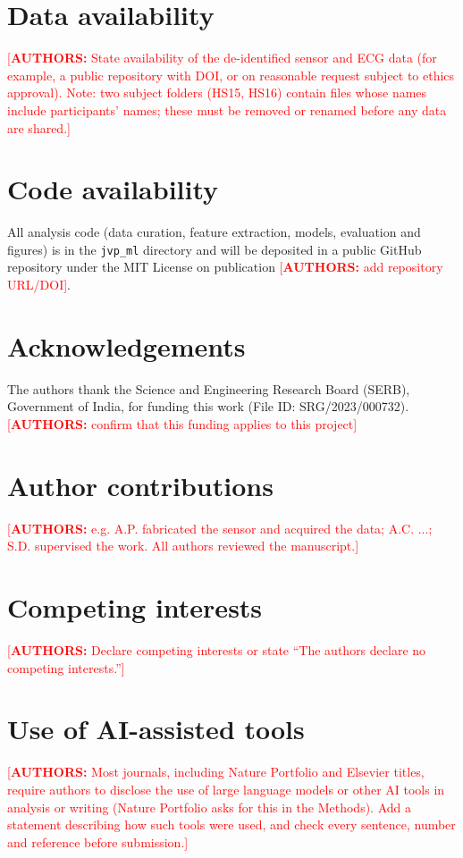 \documentclass[11pt]{article}
\newcommand{\authnote}[1]{\textcolor{red}{[\textbf{AUTHORS:} #1]}}
\begin{document}
\section*{Data availability}
\authnote{State availability of the de-identified sensor and ECG data (for example, a public repository with DOI, or on reasonable request subject to ethics approval). Note: two subject folders (HS15, HS16) contain files whose names include participants' names; these must be removed or renamed before any data are shared.}

\section*{Code availability}
All analysis code (data curation, feature extraction, models, evaluation and figures) is in the \texttt{jvp\_ml} directory and will be deposited in a public GitHub repository under the MIT License on publication \authnote{add repository URL/DOI}.

\section*{Acknowledgements}
The authors thank the Science and Engineering Research Board (SERB), Government of India, for funding this work (File ID: SRG/2023/000732). \authnote{confirm that this funding applies to this project}

\section*{Author contributions}
\authnote{e.g. A.P. fabricated the sensor and acquired the data; A.C. ...; S.D. supervised the work. All authors reviewed the manuscript.}

\section*{Competing interests}
\authnote{Declare competing interests or state ``The authors declare no competing interests.''}

\section*{Use of AI-assisted tools}
\authnote{Most journals, including Nature Portfolio and Elsevier titles, require authors to disclose the use of large language models or other AI tools in analysis or writing (Nature Portfolio asks for this in the Methods). Add a statement describing how such tools were used, and check every sentence, number and reference before submission.}
\end{document}
